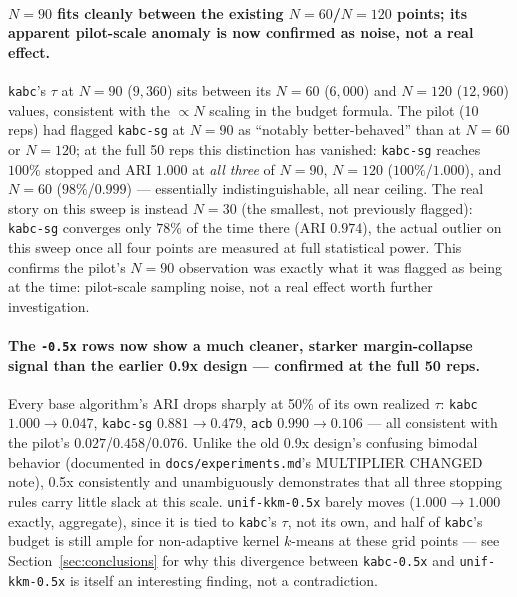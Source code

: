 \documentclass[11pt]{article}
\begin{document}
\paragraph{$N=90$ fits cleanly between the existing $N=60$/$N=120$ points;
its apparent pilot-scale anomaly is now confirmed as noise, not a real
effect.} \texttt{kabc}'s $\tau$ at $N=90$ ($9{,}360$) sits between its
$N=60$ ($6{,}000$) and $N=120$ ($12{,}960$) values, consistent with the
$\propto N$ scaling in the budget formula. The pilot (10 reps) had flagged
\texttt{kabc-sg} at $N=90$ as ``notably better-behaved'' than at $N=60$ or
$N=120$; at the full 50 reps this distinction has vanished:
\texttt{kabc-sg} reaches $100\%$ stopped and ARI $1.000$ at \emph{all
three} of $N=90$, $N=120$ ($100\%$/$1.000$), and $N=60$ ($98\%$/$0.999$)
--- essentially indistinguishable, all near ceiling. The real story on
this sweep is instead $N=30$ (the smallest, not previously flagged):
\texttt{kabc-sg} converges only $78\%$ of the time there (ARI $0.974$),
the actual outlier on this sweep once all four points are measured at
full statistical power. This confirms the pilot's $N=90$ observation was
exactly what it was flagged as being at the time: pilot-scale sampling
noise, not a real effect worth further investigation.

\paragraph{The \texttt{-0.5x} rows now show a much cleaner, starker
margin-collapse signal than the earlier 0.9x design --- confirmed at the
full 50 reps.} Every base algorithm's ARI drops sharply at 50\% of its own
realized $\tau$: \texttt{kabc} $1.000\to0.047$, \texttt{kabc-sg}
$0.881\to0.479$, \texttt{acb} $0.990\to0.106$ --- all consistent with the
pilot's $0.027$/$0.458$/$0.076$. Unlike the old 0.9x design's confusing
bimodal behavior (documented in \texttt{docs/experiments.md}'s MULTIPLIER
CHANGED note), 0.5x consistently and unambiguously demonstrates that all
three stopping rules carry little slack at this scale.
\texttt{unif-kkm-0.5x} barely moves ($1.000\to1.000$ exactly, aggregate),
since it is tied to \texttt{kabc}'s $\tau$, not its own, and half of
\texttt{kabc}'s budget is still ample for non-adaptive kernel $k$-means at
these grid points --- see Section~\ref{sec:conclusions} for why this
divergence between \texttt{kabc-0.5x} and \texttt{unif-kkm-0.5x} is itself
an interesting finding, not a contradiction.
\end{document}
